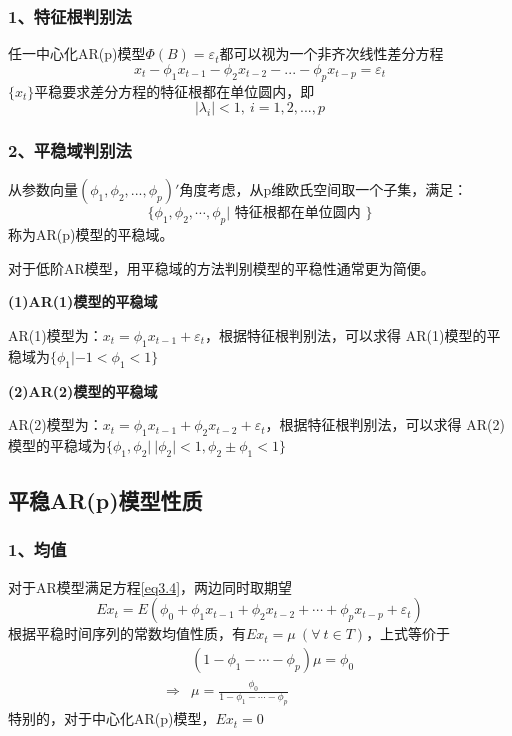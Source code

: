 \documentclass[12pt, a4paper, oneside]{ctexbook}
\begin{document}
\subsubsection{1、特征根判别法}
任一中心化AR(p)模型$\Phi(B)=\varepsilon_t$都可以视为一个非齐次线性差分方程
\begin{equation}
    x_{t}-\phi_{1}x_{t-1}-\phi_{2}x_{t-2}-...-\phi_{p}x_{t-p}=\varepsilon_{t}
\end{equation}
$\{x_t\}$平稳要求差分方程的特征根都在单位圆内，即
\begin{equation}
    |\lambda_i| < 1,~i=1,2,...,p
\end{equation}

\subsubsection{2、平稳域判别法}
从参数向量$(\phi_1,\phi_2,...,\phi_p)'$角度考虑，从p维欧氏空间取一个子集，满足：
\begin{equation*}
    \{\phi_1,\phi_2,\cdots,\phi_p|\text{ 特征根都在单位圆内 }\}
\end{equation*}
称为AR(p)模型的平稳域。

对于低阶AR模型，用平稳域的方法判别模型的平稳性通常更为简便。

\textbf{(1)AR(1)模型的平稳域}

AR(1)模型为：$x_t = \phi_1x_{t-1}+\varepsilon_t$，根据特征根判别法，可以求得
AR(1)模型的平稳域为$\{\phi_1|-1<\phi_1<1\}$

\textbf{(2)AR(2)模型的平稳域}

AR(2)模型为：$x_t = \phi_1x_{t-1}+\phi_2x_{t-2}+\varepsilon_t$，根据特征根判别法，可以求得
AR(2)模型的平稳域为$\{\phi_1,\phi_2|~|\phi_2|<1,\phi_2\pm \phi_1<1\}$

\subsection{平稳AR(p)模型性质}
\subsubsection{1、均值}
对于AR模型满足方程\ref{eq3.4}，两边同时取期望
\begin{equation*}
    Ex_t=E(\phi_0+\phi_1x_{t-1}+\phi_2x_{t-2}+\cdots+\phi_px_{t-p}+\varepsilon_t)
\end{equation*}
根据平稳时间序列的常数均值性质，有$Ex_t = \mu~(\forall~t\in T)$，上式等价于
\begin{equation*}
    \begin{aligned}
                    & (1-\phi_1-\cdots-\phi_p)\mu=\phi_0        \\
        \Rightarrow & \mu=\frac{\phi_0}{1-\phi_1-\cdots-\phi_p}
    \end{aligned}
\end{equation*}
特别的，对于中心化AR(p)模型，$Ex_t=0$
\end{document}
